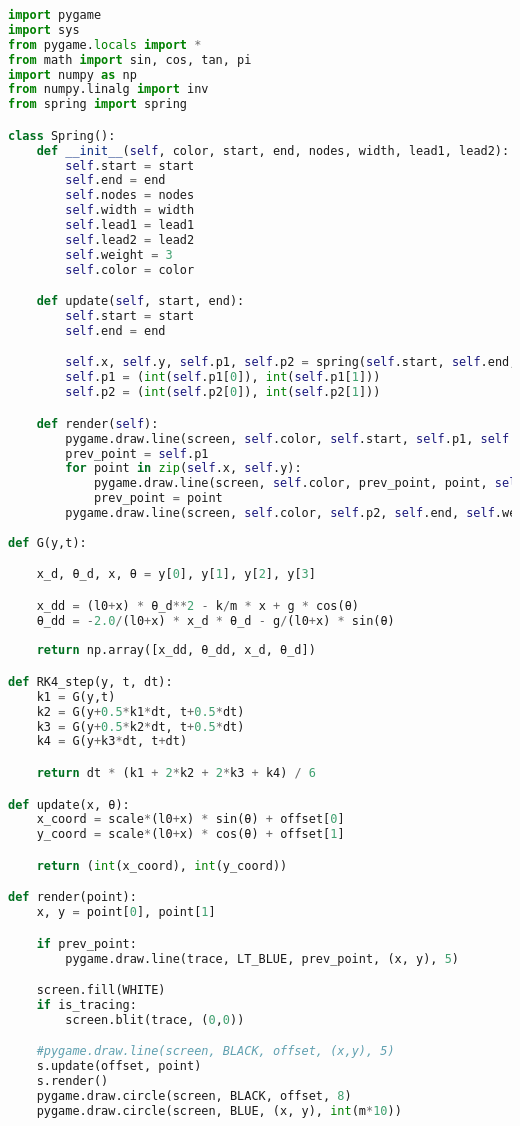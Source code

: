         \begin{lstlisting}[language=Python, caption=\textit{Path Animation Python Script for system \textbf{without} Damping}]
import pygame
import sys
from pygame.locals import *
from math import sin, cos, tan, pi
import numpy as np
from numpy.linalg import inv
from spring import spring

class Spring():
	def __init__(self, color, start, end, nodes, width, lead1, lead2):
		self.start = start
		self.end = end
		self.nodes = nodes
		self.width = width
		self.lead1 = lead1
		self.lead2 = lead2
		self.weight = 3
		self.color = color

	def update(self, start, end):
		self.start = start
		self.end = end

		self.x, self.y, self.p1, self.p2 = spring(self.start, self.end, self.nodes, self.width, self.lead1, self.lead2)
		self.p1 = (int(self.p1[0]), int(self.p1[1]))
		self.p2 = (int(self.p2[0]), int(self.p2[1]))

	def render(self):
		pygame.draw.line(screen, self.color, self.start, self.p1, self.weight)
		prev_point = self.p1
		for point in zip(self.x, self.y):
			pygame.draw.line(screen, self.color, prev_point, point, self.weight)
			prev_point = point
		pygame.draw.line(screen, self.color, self.p2, self.end, self.weight)
	
def G(y,t): 

	x_d, θ_d, x, θ = y[0], y[1], y[2], y[3]

	x_dd = (l0+x) * θ_d**2 - k/m * x + g * cos(θ)		
	θ_dd = -2.0/(l0+x) * x_d * θ_d - g/(l0+x) * sin(θ)	
	
	return np.array([x_dd, θ_dd, x_d, θ_d])

def RK4_step(y, t, dt):
	k1 = G(y,t)
	k2 = G(y+0.5*k1*dt, t+0.5*dt)
	k3 = G(y+0.5*k2*dt, t+0.5*dt)
	k4 = G(y+k3*dt, t+dt)

	return dt * (k1 + 2*k2 + 2*k3 + k4) / 6

def update(x, θ):
	x_coord = scale*(l0+x) * sin(θ) + offset[0]
	y_coord = scale*(l0+x) * cos(θ) + offset[1]

	return (int(x_coord), int(y_coord))

def render(point):
	x, y = point[0], point[1]

	if prev_point:
		pygame.draw.line(trace, LT_BLUE, prev_point, (x, y), 5)

	screen.fill(WHITE)	
	if is_tracing:
		screen.blit(trace, (0,0))

	#pygame.draw.line(screen, BLACK, offset, (x,y), 5)
	s.update(offset, point)
	s.render()
	pygame.draw.circle(screen, BLACK, offset, 8)
	pygame.draw.circle(screen, BLUE, (x, y), int(m*10))


\end{lstlisting}
